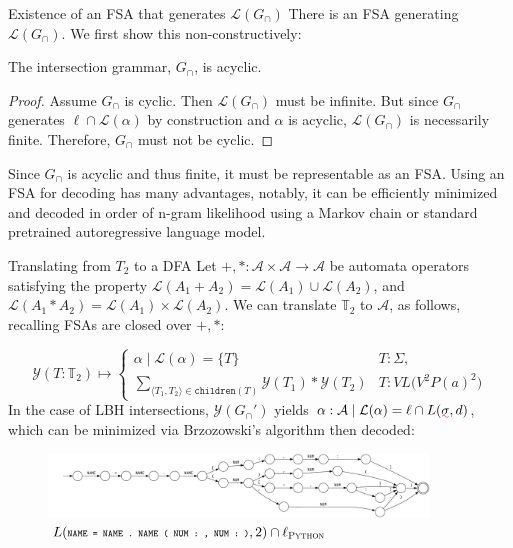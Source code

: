 \documentclass{beamer}
\begin{document}
\begin{frame}[fragile]{Existence of an FSA that generates $\mathcal{L}(G_\cap)$}
There is an FSA generating $\mathcal{L}(G_\cap)$. We first show this non-constructively:

\begin{lemma}\label{lemma:upper-bound}
The intersection grammar, $G_\cap$, is acyclic.
\end{lemma}

\begin{proof}
Assume $G_\cap$ is cyclic. Then $\mathcal{L}(G_\cap)$ must be infinite. But since $G_\cap$ generates $\ell \cap \mathcal{L}(\alpha)$ by construction and $\alpha$ is acyclic, $\mathcal{L}(G_\cap)$ is necessarily finite. Therefore, $G_\cap$ must not be cyclic.
\end{proof}

Since $G_\cap$ is acyclic and thus finite, it must be representable as an FSA. Using an FSA for decoding has many advantages, notably, it can be efficiently minimized and decoded in order of n-gram likelihood using a Markov chain or standard pretrained autoregressive language model.
\end{frame}

\begin{frame}[fragile]{Translating from $T_2$ to a DFA}
Let $+, *: \mathcal{A}\times \mathcal{A} \rightarrow \mathcal{A}$ be automata operators satisfying the property $\mathcal{L}(A_1 + A_2) = \mathcal{L}(A_1)\cup\mathcal{L}(A_2)$, and $\mathcal{L}(A_1 * A_2) = \mathcal{L}(A_1)\times\mathcal{L}(A_2)$. We can translate $\mathbb{T}_2$ to $\mathcal{A}$, as follows, recalling FSAs are closed over $+, *$:

\begin{equation*}
\mathcal{Y}(T:\mathbb{T}_2) \mapsto \begin{cases}
\alpha \mid \mathcal{L}(\alpha) = \{T\} & T: \Sigma, \\
\sum_{\langle T_1, T_2\rangle \in \texttt{children}(T)} \mathcal{Y}(T_1)*\mathcal{Y}(T_2) & T: VL\big(V^2P(a)^2\big)
\end{cases}
\end{equation*}
%
In the case of LBH intersections, $\mathcal{Y}(G_\cap')$ yields $\alpha: \mathcal{A} \mid \mathcal{L}(\alpha) = \ell\cap L(\err\sigma, d)$, which can be minimized via Brzozowski's algorithm then decoded:

\begin{figure}[H]
\centering
\includegraphics[width=0.9\textwidth]{../popl2025/exampleDFA.pdf}
\caption{$L(\scriptsize{\texttt{NAME = NAME . NAME ( NUM : , NUM : )}}, 2) \cap \ell_\textsc{Python}$}
\label{fig:exampleDFA}
\end{figure}
\end{frame}
\end{document}
